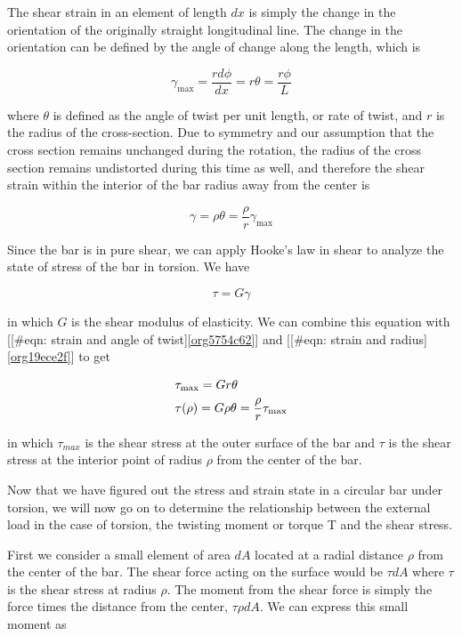 \documentclass[a4paper,openany,12pt]{book}
\begin{document}
The shear strain in an element of length \(dx\) is simply the change in
the orientation of the originally straight longitudinal line. The change
in the orientation can be defined by the angle of change along the
length, which is

$$\gamma _{\max } = \frac{rd\phi }{dx} = r\theta  = \frac{r\phi }{L}$$

where \(\theta\) is defined as the angle of twist per unit length, or rate
of twist, and \(r\) is the radius of the cross-section. Due to symmetry
and our assumption that the cross section remains unchanged during the
rotation, the radius of the cross section remains undistorted during
this time as well, and therefore the shear strain within the interior of
the bar radius away from the center is

$$ \gamma  = \rho \theta  = \frac{\rho }{r}\gamma _{\max }$$

Since the bar is in pure shear, we can apply Hooke's law in shear to
analyze the state of stress of the bar in torsion. We have

$$\tau  = G\gamma$$

in which \(G\) is the shear modulus of elasticity. We can combine this
equation with
[[\#eqn: strain and angle of twist]\ref{org5754c62}]
and [[\#eqn: strain and radius]\ref{org19ece2f}] to get

$$\begin{gathered}
    \tau _{\max } = Gr\theta  \hfill \\
    \tau (\rho ) = G\rho \theta  = \dfrac{\rho }{r}\tau _{\max } \hfill \\ 
  \end{gathered}$$

in which \(\tau_{max}\) is the shear stress at the outer surface of the
bar and \(\tau\) is the shear stress at the interior point of radius
\(\rho\) from the center of the bar.

Now that we have figured out the stress and strain state in a circular
bar under torsion, we will now go on to determine the relationship
between the external load in the case of torsion, the twisting moment or
torque T and the shear stress.

First we consider a small element of area \(dA\) located at a radial
distance \(\rho\) from the center of the bar. The shear force acting on
the surface would be \(\tau dA\) where \(\tau\) is the shear stress at
radius \(\rho\). The moment from the shear force is simply the force times
the distance from the center, \(\tau \rho dA\). We can express this small
moment as
\end{document}
